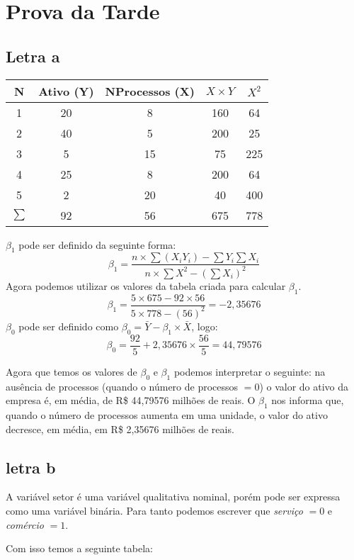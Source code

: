 \chapter{Prova da Tarde}
\section*{Letra a}
\begin{center}
    \begin{tabular}{|c|c|c|c|c|}
        \hline
        N & Ativo (Y) & NProcessos (X) & \(X \times Y\) & \(X^2\)  \\ \hline
        1 & 20 & 8 & 160 & 64 \\ \hline
        2 & 40 & 5 & 200 & 25 \\ \hline
        3 & 5 & 15 & 75 & 225 \\ \hline
        4 & 25 & 8 & 200 & 64 \\ \hline
        5 & 2 & 20 & 40 & 400 \\ \hline
        \(\sum\) & 92 & 56 & 675 & 778 \\ \hline
    \end{tabular}
\end{center}
\(\beta_{1}\) pode ser definido da seguinte forma:
\[\beta_{1} = \frac{n \times \sum (X_{i}Y_{i}) - \sum Y_{i}\sum X_{i}}{n \times \sum X^2 - (\sum X_{i})^2}\]
Agora podemos utilizar os valores da tabela criada para calcular \(\beta_{1}\).
\[ \beta_{1} = \frac{5 \times 675 - 92 \times 56}{5 \times 778 - (56)^2} = -2,35676 \]
\(\beta_{0}\) pode ser definido como \(\beta_{0} = \bar{Y} - \beta_{1} \times \bar{X}\), logo:
\[ \beta_{0} = \frac{92}{5} + 2,35676 \times \frac{56}{5} = 44,79576 \]

Agora que temos os valores de \(\beta_{0}\) e \(\beta_{1}\) podemos interpretar o seguinte: na ausência de processos (quando o número de processos \(= 0\)) o valor do ativo da empresa é, em média, de R\$ 44,79576 milhões de reais. O \(\beta_{1}\) nos informa que, quando o número de processos aumenta em uma unidade, o valor do ativo decresce, em média, em R\$ 2,35676 milhões de reais.

\section*{letra b}
A variável setor é uma variável qualitativa nominal, porém pode ser expressa como uma variável binária. Para tanto podemos escrever que \textit{serviço} \(= 0\) e \textit{comércio} \(= 1\).

Com isso temos a seguinte tabela:


